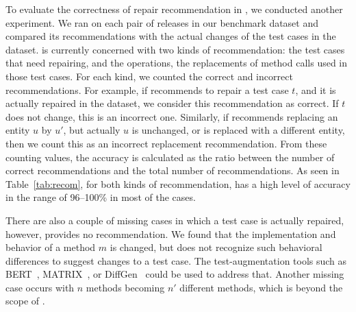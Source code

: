 To evaluate the correctness of repair recommendation in {\tool},
we conducted another experiment. We ran {\tool} on each pair of
releases in our benchmark dataset and compared its recommendations
with the actual changes of the test cases in the dataset. {\tool}
is currently concerned with two kinds of recommendation: the test
cases that need repairing, and the operations, \ie the replacements of method calls used in
those test cases. For each kind, we counted the correct and incorrect
recommendations. For example, if {\tool} recommends to repair a
test case $t$, and it is actually repaired in the dataset, we consider
this recommendation as correct. If $t$ does not change, this is an
incorrect one. Similarly, if {\tool} recommends replacing
an entity $u$ by $u'$, but actually $u$ is unchanged, or is replaced
with a different entity, then we count this as an incorrect
replacement recommendation. From these counting values, the accuracy is calculated as the ratio between
the number of correct recommendations and the total number of
recommendations. As seen in Table~\ref{tab:recom}, for both kinds of
recommendation, {\tool} has a high level of accuracy in the range of
96--100\% in most of the cases.








There are also a couple of missing cases in which a test case is
actually repaired, however, {\tool} provides no recommendation. We
found that the implementation and behavior of a method $m$ is changed,
but {\tool} does not recognize such behavioral differences to suggest
changes to a test case. The test-augmentation tools such as
BERT~\cite{bert10}, MATRIX~\cite{orso08}, or DiffGen~\cite{diffgen08}
could be used to address that. Another missing case occurs with
$n$ methods becoming $n'$ different methods, which is beyond the scope
of {\tool}.


